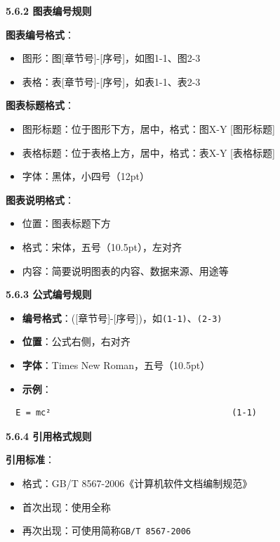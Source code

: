 \documentclass[12pt,a4paper]{article}
\numberwithin{equation}{section}  %
\begin{document}
\textbf{5.6.2 图表编号规则}

\textbf{图表编号格式}：
\begin{itemize}
\item 图形：{\ttfamily 图[章节号]-[序号]}，如{\ttfamily 图1-1}、{\ttfamily 图2-3}
\item 表格：{\ttfamily 表[章节号]-[序号]}，如{\ttfamily 表1-1}、{\ttfamily 表2-3}
\end{itemize}

\textbf{图表标题格式}：
\begin{itemize}
\item 图形标题：位于图形下方，居中，格式：{\ttfamily 图X-Y [图形标题]}
\item 表格标题：位于表格上方，居中，格式：{\ttfamily 表X-Y [表格标题]}
\item 字体：黑体，小四号（12pt）
\end{itemize}

\textbf{图表说明格式}：
\begin{itemize}
\item 位置：图表标题下方
\item 格式：宋体，五号（10.5pt），左对齐
\item 内容：简要说明图表的内容、数据来源、用途等
\end{itemize}

\textbf{5.6.3 公式编号规则}

\begin{itemize}
\item \textbf{编号格式}：{\ttfamily ([章节号]-[序号])}，如\texttt{(1-1)}、\texttt{(2-3)}
\item \textbf{位置}：公式右侧，右对齐
\item \textbf{字体}：Times New Roman，五号（10.5pt）
\item \textbf{示例}：
\end{itemize}
  \begin{lstlisting}
  E = mc²                                    (1-1)
  \end{lstlisting}

\textbf{5.6.4 引用格式规则}

\textbf{引用标准}：
\begin{itemize}
\item 格式：{\ttfamily GB/T 8567-2006《计算机软件文档编制规范》}
\item 首次出现：使用全称
\item 再次出现：可使用简称\texttt{GB/T 8567-2006}
\end{itemize}
\end{document}
